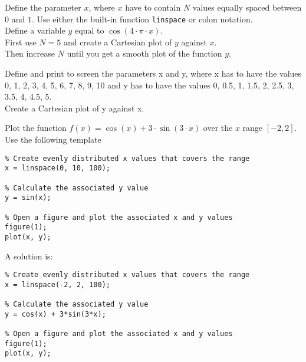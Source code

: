 \begin{ex}
Define the parameter $x$, where $x$ have to contain $N$ values equally spaced between $0$
and $1$. Use either the built-in function \texttt{linspace} or colon notation.\\
Define a variable $y$ equal to $\cos(4\cdot \pi \cdot x)$.\\
First use $N = 5$ and create a Cartesian plot of $y$ against $x$.\\
Then increase $N$ until you get a smooth plot of the function $y$.
\end{ex}



\begin{ex}
Define and print to screen the parameters x and y, where x has to have the values 0, 1,
2, 3, 4, 5, 6, 7, 8, 9, 10 and y has to have the values 0, 0.5, 1, 1.5, 2, 2.5, 3, 3.5, 4, 4.5,
5.\\
Create a Cartesian plot of y against x.
\end{ex}


\begin{ex}
Plot the function $f(x) = \cos(x) + 3 \cdot \sin(3 \cdot x)$
over the $x$ range $[-2, 2]$.
Use the following template 
\begin{lstlisting}
% Create evenly distributed x values that covers the range
x = linspace(0, 10, 100);

% Calculate the associated y value
y = sin(x);

% Open a figure and plot the associated x and y values
figure(1);
plot(x, y);
\end{lstlisting}
\begin{sol}
A solution is:
\begin{lstlisting}
% Create evenly distributed x values that covers the range
x = linspace(-2, 2, 100);

% Calculate the associated y value
y = cos(x) + 3*sin(3*x);

% Open a figure and plot the associated x and y values
figure(1);
plot(x, y);
\end{lstlisting}
\end{sol}
\end{ex}



